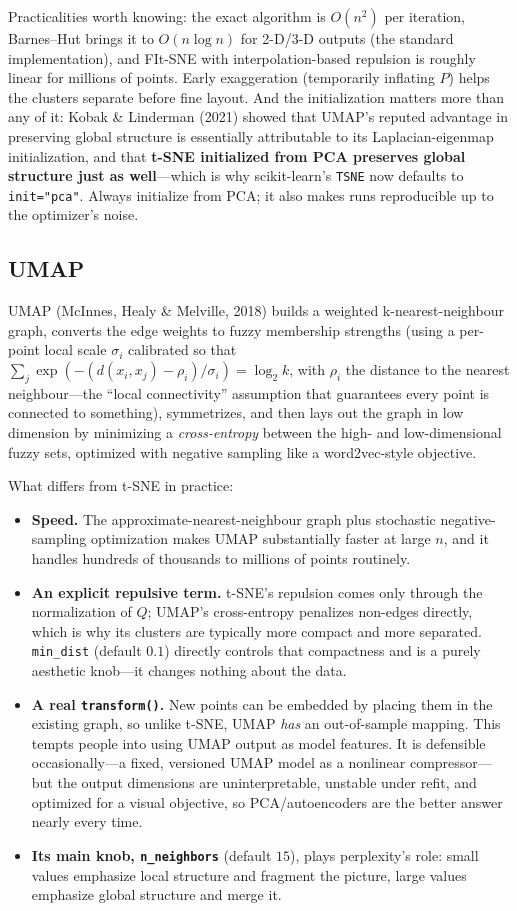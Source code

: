 Practicalities worth knowing: the exact algorithm is $O(n^2)$ per iteration, Barnes--Hut brings it to $O(n\log n)$ for 2-D/3-D outputs (the standard implementation), and FIt-SNE with interpolation-based repulsion is roughly linear for millions of points. Early exaggeration (temporarily inflating $P$) helps the clusters separate before fine layout. And the initialization matters more than any of it: Kobak \& Linderman (2021) showed that UMAP's reputed advantage in preserving global structure is essentially attributable to its Laplacian-eigenmap initialization, and that \textbf{t-SNE initialized from PCA preserves global structure just as well}---which is why scikit-learn's \texttt{TSNE} now defaults to \texttt{init="pca"}. Always initialize from PCA; it also makes runs reproducible up to the optimizer's noise.

\subsection{UMAP}

UMAP (McInnes, Healy \& Melville, 2018) builds a weighted k-nearest-neighbour graph, converts the edge weights to fuzzy membership strengths (using a per-point local scale $\sigma_i$ calibrated so that $\sum_j \exp(-(d(x_i,x_j) - \rho_i)/\sigma_i) = \log_2 k$, with $\rho_i$ the distance to the nearest neighbour---the ``local connectivity'' assumption that guarantees every point is connected to something), symmetrizes, and then lays out the graph in low dimension by minimizing a \emph{cross-entropy} between the high- and low-dimensional fuzzy sets, optimized with negative sampling like a word2vec-style objective.

What differs from t-SNE in practice:
\begin{itemize}
    \item \textbf{Speed.} The approximate-nearest-neighbour graph plus stochastic negative-sampling optimization makes UMAP substantially faster at large $n$, and it handles hundreds of thousands to millions of points routinely.
    \item \textbf{An explicit repulsive term.} t-SNE's repulsion comes only through the normalization of $Q$; UMAP's cross-entropy penalizes non-edges directly, which is why its clusters are typically more compact and more separated. \texttt{min\_dist} (default $0.1$) directly controls that compactness and is a purely aesthetic knob---it changes nothing about the data.
    \item \textbf{A real \texttt{transform()}.} New points can be embedded by placing them in the existing graph, so unlike t-SNE, UMAP \emph{has} an out-of-sample mapping. This tempts people into using UMAP output as model features. It is defensible occasionally---a fixed, versioned UMAP model as a nonlinear compressor---but the output dimensions are uninterpretable, unstable under refit, and optimized for a visual objective, so PCA/autoencoders are the better answer nearly every time.
    \item \textbf{Its main knob, \texttt{n\_neighbors}} (default $15$), plays perplexity's role: small values emphasize local structure and fragment the picture, large values emphasize global structure and merge it.
\end{itemize}

